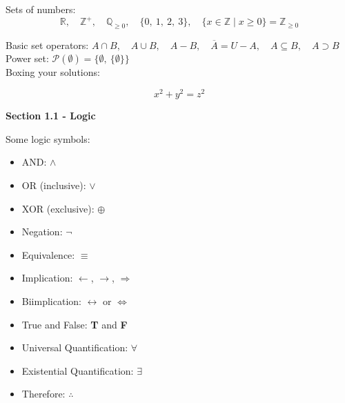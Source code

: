 \documentclass[11pt]{article}
\begin{document}
\begin{enumerate}
Sets of numbers: $$\mathbb{R},\quad \mathbb{Z}^+, \quad \mathbb{Q}_{\geq 0}, \quad \{0,~1,~2, ~3\}, \quad \{x \in \mathbb{Z} \mid x \geq 0 \} = \mathbb{Z}_{\geq 0}$$

Basic set operators: $A \cap B, \quad A \cup B, \quad A- B,\quad  \overline{A} = U - A, \quad A\subseteq B, \quad A \supset B$ \\

Power set: $\mathcal{P}(\emptyset) = \{\emptyset,~ \{\emptyset\}\}$\\

Boxing your solutions:

\begin{equation*}
 \boxed{x^2+y^2 = z^2}
\end{equation*}
\end{enumerate}



{\large\textbf{Section 1.1 - Logic}}\newline

Some logic symbols:

\begin{multicols}{2}
\begin{itemize}
\item AND: $\land$

\item OR (inclusive): $\lor$

\item XOR (exclusive): $\oplus$

\item Negation: $\lnot$

\item Equivalence: $\equiv$

\item Implication: $\leftarrow$, $\rightarrow$, $\Rightarrow$
\end{itemize}

\begin{itemize}
\item Biimplication: $\leftrightarrow$ or $\Leftrightarrow$

\item True and False: \textbf{T} and \textbf{F}

\item Universal Quantification: $\forall$

\item Existential Quantification: $\exists$

\item Therefore: $\therefore$


\end{itemize}
\end{multicols}
 
\end{document}
